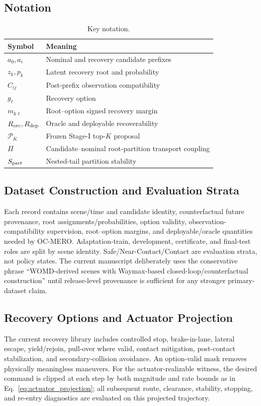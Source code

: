 \documentclass[conference]{IEEEtran}
\begin{document}
\subsection{Notation}
\begin{table}[h]
\centering
\caption{Key notation.}
\begin{tabular}{ll}
\toprule
Symbol & Meaning \\
\midrule
$a_0,a_i$ & Nominal and recovery candidate prefixes \\
$z_k,p_k$ & Latent recovery root and probability \\
$C_{ij}$ & Post-prefix observation compatibility \\
$g_\ell$ & Recovery option \\
$m_{k\ell}$ & Root--option signed recovery margin \\
$R_{\rm orc},R_{\rm dep}$ & Oracle and deployable recoverability \\
$\mathcal{P}_K$ & Frozen Stage-I top-$K$ proposal \\
$\Pi$ & Candidate--nominal root-partition transport coupling \\
$S_{\rm part}$ & Nested-tail partition stability \\
\bottomrule
\end{tabular}
\end{table}

\subsection{Dataset Construction and Evaluation Strata}
\label{app:dataset}
Each record contains scene/time and candidate identity, counterfactual future provenance, root assignments/probabilities, option validity, observation-compatibility supervision, root--option margins, and deployable/oracle quantities needed by OC-MERO. Adaptation-train, development, certificate, and final-test roles are split by scene identity. Safe/Near-Contact/Contact are evaluation strata, not policy states. The current manuscript deliberately uses the conservative phrase ``WOMD-derived scenes with Waymax-based closed-loop/counterfactual construction'' until release-level provenance is sufficient for any stronger primary-dataset claim.

\subsection{Recovery Options and Actuator Projection}
\label{app:recovery_modes}
The current recovery library includes controlled stop, brake-in-lane, lateral escape, yield/rejoin, pull-over where valid, contact mitigation, post-contact stabilization, and secondary-collision avoidance. An option-valid mask removes physically meaningless maneuvers. For the actuator-realizable witness, the desired command is clipped at each step by both magnitude and rate bounds as in Eq.~\eqref{eq:actuator_projection}; all subsequent route, clearance, stability, stopping, and re-entry diagnostics are evaluated on this projected trajectory.
\end{document}
